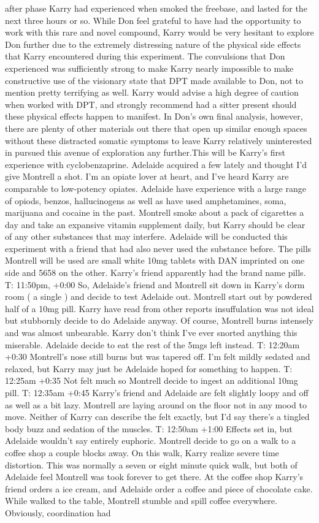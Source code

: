 \documentclass[12pt]{book}
\begin{document}
after phase Karry had experienced when smoked the freebase, and lasted for the next three hours or so. While Don feel grateful to have had the opportunity to work with this rare and novel compound, Karry would be very hesitant to explore Don further due to the extremely distressing nature of the physical side effects that Karry encountered during this experiment. The convulsions that Don experienced was sufficiently strong to make Karry nearly impossible to make constructive use of the visionary state that DPT made available to Don, not to mention pretty terrifying as well. Karry would advise a high degree of caution when worked with DPT, and strongly recommend had a sitter present should these physical effects happen to manifest. In Don's own final analysis, however, there are plenty of other materials out there that open up similar enough spaces without these distracted somatic symptoms to leave Karry relatively uninterested in pursued this avenue of exploration any further.This will be Karry's first experience with cyclobenzaprine. Adelaide acquired a few lately and thought I'd give Montrell a shot. I'm an opiate lover at heart, and I've heard Karry are comparable to low-potency opiates. Adelaide have experience with a large range of opiods, benzos, hallucinogens as well as have used amphetamines, soma, marijuana and cocaine in the past. Montrell smoke about a pack of cigarettes a day and take an expansive vitamin supplement daily, but Karry should be clear of any other substances that may interfere. Adelaide will be conducted this experiment with a friend that had also never used the substance before. The pills Montrell will be used are small white 10mg tablets with DAN imprinted on one side and 5658 on the other. Karry's friend apparently had the brand name pills. T: 11:50pm, +0:00 So, Adelaide's friend and Montrell sit down in Karry's dorm room ( a single ) and decide to test Adelaide out. Montrell start out by powdered half of a 10mg pill. Karry have read from other reports insuffulation was not ideal but stubbornly decide to do Adelaide anyway. Of course, Montrell burns intensely and was almost unbearable. Karry don't think I've ever snorted anything this miserable. Adelaide decide to eat the rest of the 5mgs left instead. T: 12:20am +0:30 Montrell's nose still burns but was tapered off. I'm felt mildly sedated and relaxed, but Karry may just be Adelaide hoped for something to happen. T: 12:25am +0:35 Not felt much so Montrell decide to ingest an additional 10mg pill. T: 12:35am +0:45 Karry's friend and Adelaide are felt slightly loopy and off as well as a bit lazy. Montrell are laying around on the floor not in any mood to move. Neither of Karry can describe the felt exactly, but I'd say there's a tingled body buzz and sedation of the muscles. T: 12:50am +1:00 Effects set in, but Adelaide wouldn't say entirely euphoric. Montrell decide to go on a walk to a coffee shop a couple blocks away. On this walk, Karry realize severe time distortion. This was normally a seven or eight minute quick walk, but both of Adelaide feel Montrell was took forever to get there. At the coffee shop Karry's friend orders a ice cream, and Adelaide order a coffee and piece of chocolate cake. While walked to the table, Montrell stumble and spill coffee everywhere. Obviously, coordination had 
\end{document}
